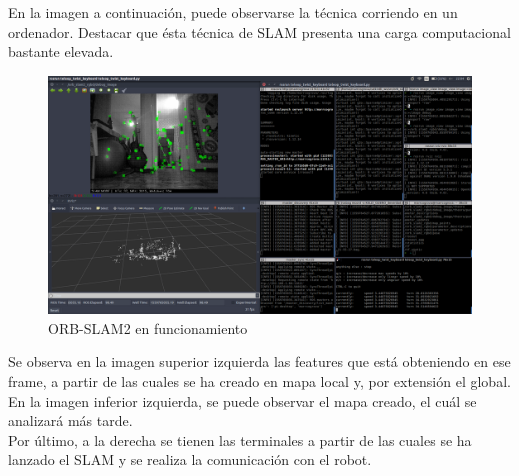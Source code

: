 En la imagen a continuación, puede observarse la técnica corriendo en un ordenador. Destacar que ésta técnica de SLAM presenta una carga computacional bastante elevada.
\begin{figure}[h!]
    \centering
    \includegraphics[width=1\textwidth]{images/working_zone_orb}
    \caption{ORB-SLAM2 en funcionamiento}
\end{figure}

Se observa en la imagen superior izquierda las features que está obteniendo en ese frame, a partir de las cuales se ha creado en mapa local y,
por extensión el global. En la imagen inferior izquierda, se puede observar el mapa creado, el cuál se analizará más tarde.\\
Por último, a la derecha se tienen las terminales a partir de las cuales se ha lanzado el SLAM y se realiza la comunicación con el robot.\\

\newpage

